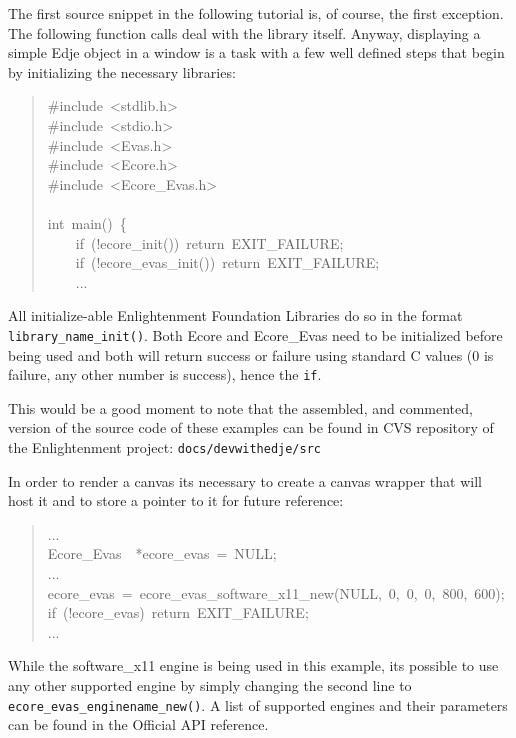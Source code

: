 \documentclass[12pt,a4paper,english]{book}
\begin{document}
The first source snippet in the following tutorial is, of course, the first
exception. The following function calls deal with the library itself. Anyway,
displaying a simple Edje object in a window is a task with a few well defined
steps that begin by initializing the necessary libraries:
\begin{quote}{\ttfamily \raggedright \noindent
{\#}include~<stdlib.h>~\\
{\#}include~<stdio.h>~\\
{\#}include~<Evas.h>~\\
{\#}include~<Ecore.h>~\\
{\#}include~<Ecore{\_}Evas.h>~\\
~\\
int~main()~{\{}~\\
~~~~if~(!ecore{\_}init())~return~EXIT{\_}FAILURE;~\\
~~~~if~(!ecore{\_}evas{\_}init())~return~EXIT{\_}FAILURE;~\\
~~~~...
}\end{quote}

All initialize-able Enlightenment Foundation Libraries do so in the format
\texttt{library{\_}name{\_}init()}. Both Ecore and Ecore{\_}Evas need to be initialized
before being used and both will return success or failure using standard C
values (0 is failure, any other number is success), hence the \texttt{if}.

This would be a good moment to note that the assembled, and commented, version
of the source code of these examples can be found in CVS repository of the
Enlightenment project: \texttt{docs/devwithedje/src}

In order to render a canvas its necessary to create a canvas wrapper that will
host it and to store a pointer to it for future reference:
\begin{quote}{\ttfamily \raggedright \noindent
...~\\
Ecore{\_}Evas~~*ecore{\_}evas~=~NULL;~\\
...~\\
ecore{\_}evas~=~ecore{\_}evas{\_}software{\_}x11{\_}new(NULL,~0,~0,~0,~800,~600);~\\
if~(!ecore{\_}evas)~return~EXIT{\_}FAILURE;~\\
...
}\end{quote}

While the software{\_}x11 engine is being used in this example, its possible to
use any other supported engine by simply changing the second line to
\texttt{ecore{\_}evas{\_}enginename{\_}new()}. A list of supported engines and their
parameters can be found in the Official API reference.
\end{document}
